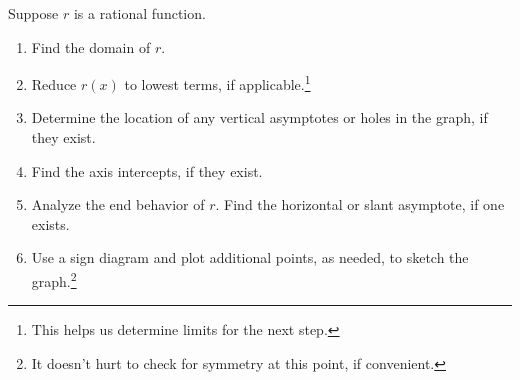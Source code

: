 \documentclass{ximera}
\begin{document}
\hspace{.17in} Suppose $r$ is a rational function. 

\begin{enumerate}

\item  Find the domain of $r$.

\item  Reduce $r(x)$ to lowest terms, if applicable.\footnote{This helps us determine limits for the next step.}

\item  Determine the location of any vertical asymptotes or holes in the graph, if they exist. 

\item  Find the axis intercepts, if they exist.

\item  Analyze the end behavior of $r$.  Find the horizontal or slant asymptote, if one exists.

\item  Use a sign diagram and plot additional points, as needed, to sketch the graph.\footnote{It doesn't hurt to check for symmetry at this point, if convenient.}

\end{enumerate}


\bigskip
\end{document}
